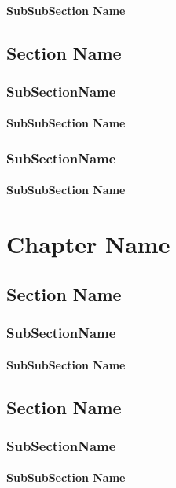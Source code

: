 \subsubsection{SubSubSection Name}
\blindtext
\section{Section Name}
\blindtext
\subsection{SubSectionName}
\blindtext
\subsubsection{SubSubSection Name}
\blindtext
\blindtext
\subsection{SubSectionName}
\blindtext
\subsubsection{SubSubSection Name}
\blindtext
\chapter{Chapter Name}
\blindtext
\cite{stallman99:telepolis}
\section{Section Name}
\blindtext
\subsection{SubSectionName}
\blindtext
\subsubsection{SubSubSection Name}
\blindtext
\section{Section Name}
\blindtext
\subsection{SubSectionName}
\blindtext
\subsubsection{SubSubSection Name}
\blindtext
